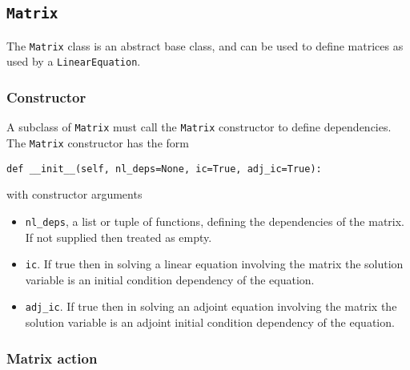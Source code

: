 \documentclass[11pt]{article}
\begin{document}
\subsection{\texttt{Matrix}}

The \texttt{Matrix} class is an abstract base class, and can be used to define
matrices as used by a \texttt{LinearEquation}.

\subsubsection{Constructor}

A subclass of \texttt{Matrix} must call the \texttt{Matrix} constructor to
define dependencies. The \texttt{Matrix} constructor has the form
\begin{lstlisting}
def __init__(self, nl_deps=None, ic=True, adj_ic=True):
\end{lstlisting}
with constructor arguments
\begin{itemize}
  \item \texttt{nl\_deps}, a list or tuple of functions, defining the
    dependencies of the matrix. If not supplied then treated as empty.
  \item \texttt{ic}. If true then in solving a linear equation involving the
    matrix the solution variable is an initial condition dependency of the
    equation.
  \item \texttt{adj\_ic}. If true then in solving an adjoint equation
    involving the matrix the solution variable is an adjoint initial
    condition dependency of the equation.
\end{itemize}

\subsubsection{Matrix action}
\end{document}
